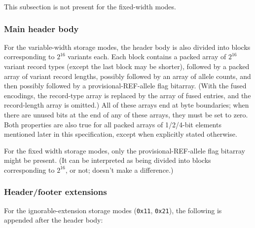 \documentclass[8pt]{article}
\begin{document}
This subsection is not present for the fixed-width modes.

\subsubsection{Main header body}

For the variable-width storage modes, the header body is also divided into
blocks corresponding to $2^{16}$ variants each.  Each block contains a packed
array of $2^{16}$ variant record types (except the last block may be shorter),
followed by a packed array of variant record lengths, possibly followed by an
array of allele counts, and then possibly followed by a provisional-REF-allele
flag bitarray.  (With the fused encodings, the record-type array is replaced
by the array of fused entries, and the record-length array is omitted.)  All
of these arrays end at byte boundaries; when there are
unused bits at the end of any of these arrays, they must be set to zero.  Both
properties are also true for all packed arrays of 1/2/4-bit elements mentioned
later in this specification, except when explicitly stated otherwise.

For the fixed width storage modes, only the provisional-REF-allele flag
bitarray might be present.  (It can be interpreted as being divided into blocks
corresponding to $2^{16}$, or not; doesn't make a difference.)

\subsubsection{Header/footer extensions}

For the ignorable-extension storage modes (\texttt{0x11}, \texttt{0x21}), the
following is appended after the header body:
\end{document}
